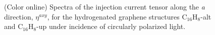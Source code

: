 \documentclass[pss]{wiley2sp} %
\begin{document}
\begin{figure}
\hfill
{}
\caption{(Color online) Spectra of the injection current tensor along the
     \emph{a} direction, {$\eta^{axy}$}, for the hydrogenated graphene structures
    C$_{16}$H$_{8}$-alt and C$_{16}$H$_{8}$-up under incidence of circularly polarized light.\label{fig:eta}}
\end{figure}
\end{document}
